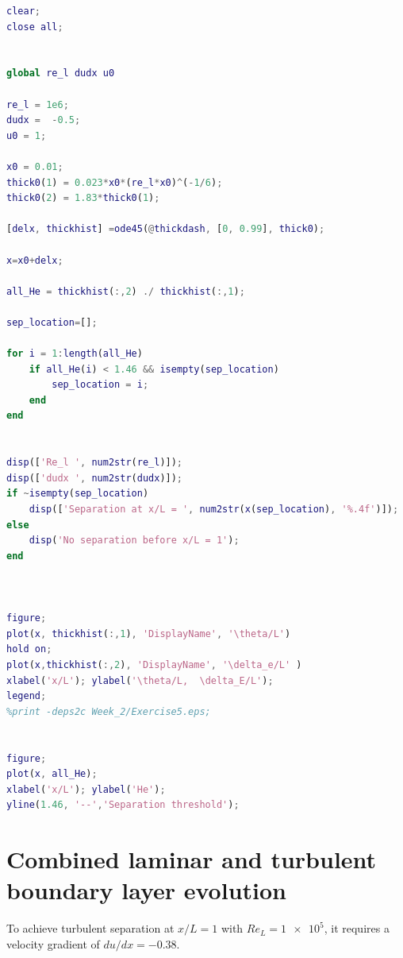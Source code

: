 \documentclass{article}
\begin{document}
\begin{lstlisting}[language=Matlab, caption={Script for finding the location of turbulent separation points. (Exercise 5)}]
clear;
close all;


global re_l dudx u0

re_l = 1e6;
dudx =  -0.5;
u0 = 1;

x0 = 0.01;
thick0(1) = 0.023*x0*(re_l*x0)^(-1/6);
thick0(2) = 1.83*thick0(1);

[delx, thickhist] =ode45(@thickdash, [0, 0.99], thick0);

x=x0+delx;

all_He = thickhist(:,2) ./ thickhist(:,1);

sep_location=[];

for i = 1:length(all_He)
    if all_He(i) < 1.46 && isempty(sep_location)
        sep_location = i;
    end
end


disp(['Re_l ', num2str(re_l)]);
disp(['dudx ', num2str(dudx)]);
if ~isempty(sep_location)
    disp(['Separation at x/L = ', num2str(x(sep_location), '%.4f')]);
else
    disp('No separation before x/L = 1');
end



figure;
plot(x, thickhist(:,1), 'DisplayName', '\theta/L')
hold on;
plot(x,thickhist(:,2), 'DisplayName', '\delta_e/L' )
xlabel('x/L'); ylabel('\theta/L,  \delta_E/L');
legend;
%print -deps2c Week_2/Exercise5.eps;


figure;
plot(x, all_He);
xlabel('x/L'); ylabel('He');
yline(1.46, '--','Separation threshold');

\end{lstlisting}

\newpage
\section{Combined laminar and turbulent boundary layer evolution}
To achieve turbulent separation at $x/L=1$ with $Re_L = \num{1e5}$, it requires a velocity gradient of $du/dx = -0.38$.
\end{document}
